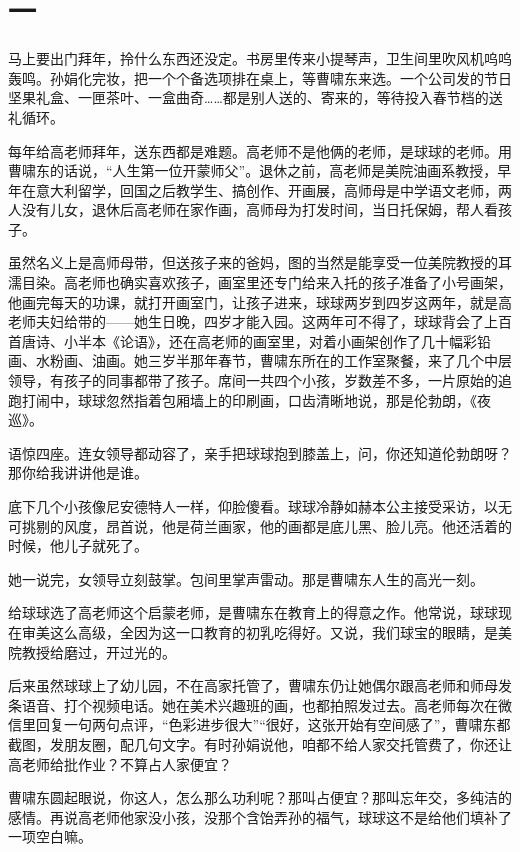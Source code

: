 \documentclass[lang=cn,newtx,12pt,scheme=chinese]{elegantbook}
\begin{document}
\section{一}
马上要出门拜年，拎什么东西还没定。书房里传来小提琴声，卫生间里吹风机呜呜轰鸣。孙娟化完妆，把一个个备选项排在桌上，等曹啸东来选。一个公司发的节日坚果礼盒、一匣茶叶、一盒曲奇……都是别人送的、寄来的，等待投入春节档的送礼循环。

每年给高老师拜年，送东西都是难题。高老师不是他俩的老师，是球球的老师。用曹啸东的话说，“人生第一位开蒙师父”。退休之前，高老师是美院油画系教授，早年在意大利留学，回国之后教学生、搞创作、开画展，高师母是中学语文老师，两人没有儿女，退休后高老师在家作画，高师母为打发时间，当日托保姆，帮人看孩子。

虽然名义上是高师母带，但送孩子来的爸妈，图的当然是能享受一位美院教授的耳濡目染。高老师也确实喜欢孩子，画室里还专门给来入托的孩子准备了小号画架，他画完每天的功课，就打开画室门，让孩子进来，球球两岁到四岁这两年，就是高老师夫妇给带的——她生日晚，四岁才能入园。这两年可不得了，球球背会了上百首唐诗、小半本《论语》，还在高老师的画室里，对着小画架创作了几十幅彩铅画、水粉画、油画。她三岁半那年春节，曹啸东所在的工作室聚餐，来了几个中层领导，有孩子的同事都带了孩子。席间一共四个小孩，岁数差不多，一片原始的追跑打闹中，球球忽然指着包厢墙上的印刷画，口齿清晰地说，那是伦勃朗，《夜巡》。

语惊四座。连女领导都动容了，亲手把球球抱到膝盖上，问，你还知道伦勃朗呀？那你给我讲讲他是谁。

底下几个小孩像尼安德特人一样，仰脸傻看。球球冷静如赫本公主接受采访，以无可挑剔的风度，昂首说，他是荷兰画家，他的画都是底儿黑、脸儿亮。他还活着的时候，他儿子就死了。

她一说完，女领导立刻鼓掌。包间里掌声雷动。那是曹啸东人生的高光一刻。

给球球选了高老师这个启蒙老师，是曹啸东在教育上的得意之作。他常说，球球现在审美这么高级，全因为这一口教育的初乳吃得好。又说，我们球宝的眼睛，是美院教授给磨过，开过光的。

后来虽然球球上了幼儿园，不在高家托管了，曹啸东仍让她偶尔跟高老师和师母发条语音、打个视频电话。她在美术兴趣班的画，也都拍照发过去。高老师每次在微信里回复一句两句点评，“色彩进步很大”“很好，这张开始有空间感了”，曹啸东都截图，发朋友圈，配几句文字。有时孙娟说他，咱都不给人家交托管费了，你还让高老师给批作业？不算占人家便宜？

曹啸东圆起眼说，你这人，怎么那么功利呢？那叫占便宜？那叫忘年交，多纯洁的感情。再说高老师他家没小孩，没那个含饴弄孙的福气，球球这不是给他们填补了一项空白嘛。
\end{document}
